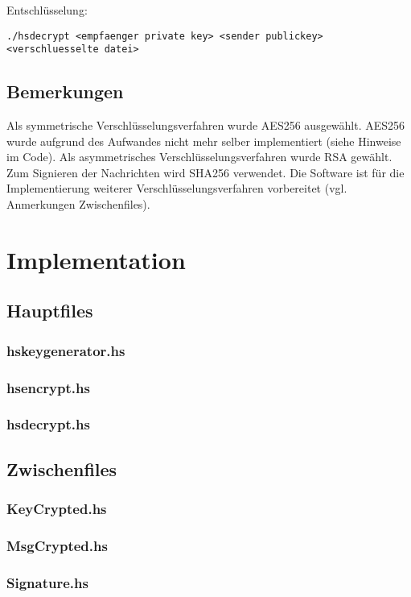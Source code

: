\documentclass[11pt,a4paper,parskip=half]{scrartcl}
\begin{document}
Entschlüsselung:
\begin{lstlisting}
./hsdecrypt <empfaenger private key> <sender publickey> <verschluesselte datei>
\end{lstlisting}

\subsection{Bemerkungen}
Als symmetrische Verschlüsselungsverfahren wurde AES256 ausgewählt. AES256 wurde aufgrund des Aufwandes nicht mehr selber implementiert (siehe Hinweise im Code). Als asymmetrisches Verschlüsselungsverfahren wurde RSA gewählt. Zum Signieren der Nachrichten wird SHA256 verwendet. Die Software ist für die Implementierung weiterer Verschlüsselungsverfahren vorbereitet (vgl. Anmerkungen Zwischenfiles).

\section{Implementation}
\subsection{Hauptfiles}
\subsubsection{hskeygenerator.hs}

\subsubsection{hsencrypt.hs}

\subsubsection{hsdecrypt.hs}

\subsection{Zwischenfiles}
\subsubsection{KeyCrypted.hs}

\subsubsection{MsgCrypted.hs}

\subsubsection{Signature.hs}

\end{document}

